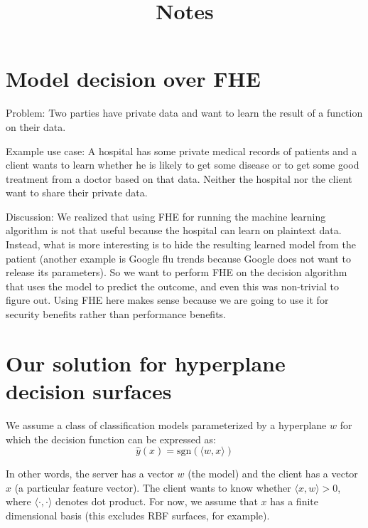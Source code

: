\documentclass[11pt]{article}
\title{Notes}
\begin{document}
\date{}

\maketitle

\vspace{-2cm}


\section{Model decision over FHE}

Problem: Two parties have private data and want to learn the result of a function on their data.

\noindent Example use case:  A hospital  has some private medical records of patients and a client wants to learn whether he is likely to get some disease or to get some good treatment from a doctor based on that data. Neither the hospital nor the client want to share their private data.

Discussion:
We realized that using FHE for running the machine learning algorithm is not that useful because the hospital can learn on plaintext data. Instead, what is more interesting is to hide the resulting learned model from the patient (another example is Google flu trends because Google does not want to release its parameters). So we want to perform FHE on the decision algorithm that uses the model to predict the outcome, and even this was non-trivial to figure out.
Using FHE here makes sense because we are going to use it for security benefits rather than performance benefits.


\section{Our solution for hyperplane decision surfaces}
\label{sec:hyperplane_decision}      

\newcommand{\res}{\mathsf{res}}

We assume a class of classification models parameterized by a hyperplane $w$
for which the decision function can be expressed as:
\begin{equation*}
  \hat{y}(x) = \text{sgn}(\langle w, x \rangle) 
\end{equation*}

In other words, the server has a vector $w$ (the model) and the client has a
vector $x$ (a particular feature vector). The client wants to know whether
$\langle x, w \rangle > 0$, where $\langle \cdot, \cdot \rangle$ denotes dot product. For
now, we assume that $x$ has a finite dimensional basis (this excludes RBF
surfaces, for example).
\end{document}
